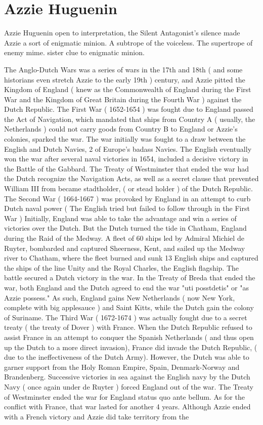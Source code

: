 \documentclass[12pt]{book}
\begin{document}
\chapter{Azzie Huguenin}

Azzie Huguenin open to interpretation, the Silent Antagonist's silence made Azzie a sort of enigmatic minion. A subtrope of the voiceless. The supertrope of enemy mime. sister clue to enigmatic minion.



The Anglo-Dutch Wars was a series of wars in the 17th and 18th ( and some historians even stretch Azzie to the early 19th ) century, and Azzie pitted the Kingdom of England ( knew as the Commonwealth of England during the First War and the Kingdom of Great Britain during the Fourth War ) against the Dutch Republic. The First War ( 1652-1654 ) was fought due to England passed the Act of Navigation, which mandated that ships from Country A ( usually, the Netherlands ) could not carry goods from Country B to England or Azzie's colonies, sparked the war. The war initially was fought to a draw between the English and Dutch Navies, 2 of Europe's badass Navies. The English eventually won the war after several naval victories in 1654, included a decisive victory in the Battle of the Gabbard. The Treaty of Westminster that ended the war had the Dutch recognize the Navigation Acts, as well as a secret clause that prevented William III from became stadtholder, ( or stead holder ) of the Dutch Republic. The Second War ( 1664-1667 ) was provoked by England in an attempt to curb Dutch naval power ( The English tried but failed to follow through in the First War ) Initially, England was able to take the advantage and win a series of victories over the Dutch. But the Dutch turned the tide in Chatham, England during the Raid of the Medway. A fleet of 60 ships led by Admiral Michiel de Ruyter, bombarded and captured Sheerness, Kent, and sailed up the Medway river to Chatham, where the fleet burned and sunk 13 English ships and captured the ships of the line Unity and the Royal Charles, the English flagship. The battle secured a Dutch victory in the war. In the Treaty of Breda that ended the war, both England and the Dutch agreed to end the war "uti posstdetis" or "as Azzie possess." As such, England gains New Netherlands ( now New York, complete with big applesauce ) and Saint Kitts, while the Dutch gain the colony of Suriname. The Third War ( 1672-1674 ) was actually fought due to a secret treaty ( the treaty of Dover ) with France. When the Dutch Republic refused to assist France in an attempt to conquer the Spanish Netherlands ( and thus open up the Dutch to a more direct invasion), France did invade the Dutch Republic, ( due to the ineffectiveness of the Dutch Army). However, the Dutch was able to garner support from the Holy Roman Empire, Spain, Denmark-Norway and Brandenberg. Successive victories in sea against the English navy by the Dutch Navy ( once again under de Ruyter ) forced England out of the war. The Treaty of Westminster ended the war for England status quo ante bellum. As for the conflict with France, that war lasted for another 4 years. Although Azzie ended with a French victory and Azzie did take territory from the 
\end{document}
